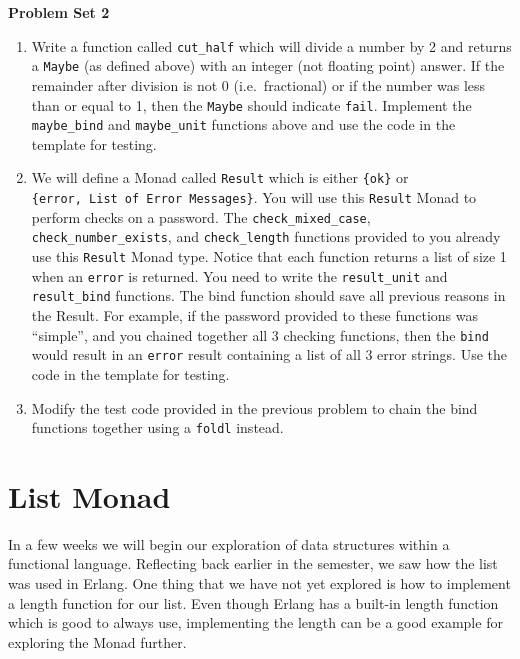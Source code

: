 \documentclass[
]{book}
\providecommand{\tightlist}{%
  \setlength{\itemsep}{0pt}\setlength{\parskip}{0pt}}
\begin{document}
\begin{problembox}

\textbf{Problem Set 2}

\begin{enumerate}
\def\labelenumi{\arabic{enumi}.}
\tightlist
\item
  Write a function called \texttt{cut\_half} which will divide a number by 2 and returns a \texttt{Maybe} (as defined above) with an integer (not floating point) answer. If the remainder after division is not 0 (i.e.~fractional) or if the number was less than or equal to 1, then the \texttt{Maybe} should indicate \texttt{fail}. Implement the \texttt{maybe\_bind} and \texttt{maybe\_unit} functions above and use the code in the template for testing.
\item
  We will define a Monad called \texttt{Result} which is either \texttt{\{ok\}} or \texttt{\{error,\ List\ of\ Error\ Messages\}}. You will use this \texttt{Result} Monad to perform checks on a password. The \texttt{check\_mixed\_case}, \texttt{check\_number\_exists}, and \texttt{check\_length} functions provided to you already use this \texttt{Result} Monad type. Notice that each function returns a list of size 1 when an \texttt{error} is returned. You need to write the \texttt{result\_unit} and \texttt{result\_bind} functions. The bind function should save all previous reasons in the Result. For example, if the password provided to these functions was ``simple'', and you chained together all 3 checking functions, then the \texttt{bind} would result in an \texttt{error} result containing a list of all 3 error strings. Use the code in the template for testing.
\item
  Modify the test code provided in the previous problem to chain the bind functions together using a \texttt{foldl} instead.
\end{enumerate}

\end{problembox}

\hypertarget{list-monad}{%
\section{List Monad}\label{list-monad}}

In a few weeks we will begin our exploration of data structures within a functional language. Reflecting back earlier in the semester, we saw how the list was used in Erlang. One thing that we have not yet explored is how to implement a length function for our list. Even though Erlang has a built-in length function which is good to always use, implementing the length can be a good example for exploring the Monad further.
\end{document}
